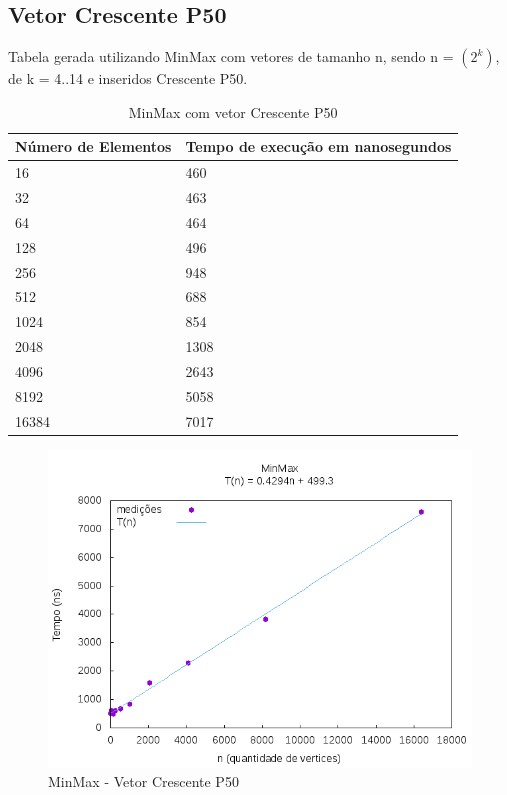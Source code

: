 \documentclass[12pt,a4paper,twoside]{report}
\begin{document}
\subsection{Vetor Crescente P50}
Tabela gerada utilizando MinMax com vetores de tamanho n, sendo n = $(2^k)$, de k = 4..14 e inseridos Crescente P50.
\begin{table}[H]
\centering
\caption{MinMax com vetor Crescente P50}
\label{my-label}
\begin{tabular}{|l|l|}
\hline
\multicolumn{1}{|c|}{\textbf{Número de Elementos}} & \multicolumn{1}{c|}{\textbf{Tempo de execução em nanosegundos}} \\ \hline
16 & 460 \\ \hline
32 & 463 \\ \hline
64 & 464 \\ \hline
128 & 496 \\ \hline
256 & 948 \\ \hline
512 & 688 \\ \hline
1024 & 854 \\ \hline
2048 & 1308 \\ \hline
4096 & 2643 \\ \hline
8192 & 5058 \\ \hline
16384 & 7017 \\ \hline
\end{tabular}
\end{table}

\begin{figure}[H]
    \centering
    \includegraphics[width=0.7\linewidth]{graficos/Min Max/Crescente P50/MinMax.png}
  \caption{MinMax - Vetor Crescente P50}
\end{figure}
\end{document}
